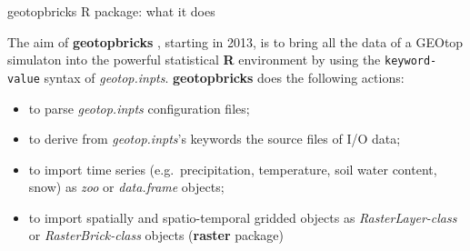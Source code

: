 \documentclass[ignorenonframetext,]{beamer}
\providecommand{\tightlist}{%
  \setlength{\itemsep}{0pt}\setlength{\parskip}{0pt}}
\begin{document}
\begin{frame}[fragile]{geotopbricks R package: what it does}

The aim of \textbf{geotopbricks} , starting in 2013, is to bring all the
data of a GEOtop simulaton into the powerful statistical \textbf{R}
environment by using the \texttt{keyword-value} syntax of
\emph{geotop.inpts}. \textbf{geotopbricks} does the following actions:

\begin{itemize}
\tightlist
\item
  to parse \emph{geotop.inpts} configuration files;
\item
  to derive from \emph{geotop.inpts}'s keywords the source files of I/O
  data;
\item
  to import time series (e.g.~precipitation, temperature, soil water
  content, snow) as \emph{zoo} or \emph{data.frame} objects;
\item
  to import spatially and spatio-temporal gridded objects as
  \emph{RasterLayer-class} or \emph{RasterBrick-class} objects
  (\textbf{raster} package)
\end{itemize}

\end{frame}
\end{document}
